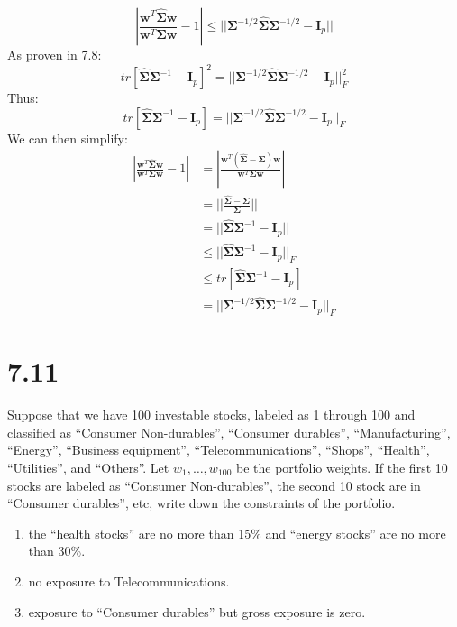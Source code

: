 \documentclass[11pt,]{article}
\begin{document}
\[
|\frac{{\bm{{w}}}^T \hat{{\bm{{\Sigma}}}} {\bm{{w}}} }{ {\bm{{w}}}^T {\bm{{\Sigma}}} {\bm{{w}}}}-1| \leq || {\bm{{\Sigma}}} ^{-1/2} \hat{{\bm{{\Sigma}}}} {\bm{{\Sigma}}}^{-1/2} - {\bm{{I}}}_p||
\] As proven in 7.8: \[
tr[\hat{{\bm{{\Sigma}}}} {\bm{{\Sigma}}}^{-1} - {\bm{{I}}}_p]^2 = || {\bm{{\Sigma}}}^{-1/2} \hat{{\bm{{\Sigma}}}} {\bm{{\Sigma}}}^{-1/2} - {\bm{{I}}}_p||_F^2
\] Thus: \[
tr[\hat{{\bm{{\Sigma}}}} {\bm{{\Sigma}}}^{-1} - {\bm{{I}}}_p] = || {\bm{{\Sigma}}}^{-1/2} \hat{{\bm{{\Sigma}}}} {\bm{{\Sigma}}}^{-1/2} - {\bm{{I}}}_p||_F
\] We can then simplify: \[
\begin{aligned}
|\frac{{\bm{{w}}}^T \hat{{\bm{{\Sigma}}}} {\bm{{w}}} }{ {\bm{{w}}}^T {\bm{{\Sigma}}} {\bm{{w}}}}-1| &=
|\frac{{\bm{{w}}}^T(\hat{{\bm{{\Sigma}}}} - {\bm{{\Sigma}}}) {\bm{{w}}}}{ {\bm{{w}}}^T {\bm{{\Sigma}}} {\bm{{w}}} } |\\
&= || \frac{\hat{{\bm{{\Sigma}}}} - {\bm{{\Sigma}}} }{{\bm{{\Sigma}}}}|| \\
&= ||\hat{{\bm{{\Sigma}}}} {\bm{{\Sigma}}}^{-1} - {\bm{{I}}}_p || \\
&\leq ||\hat{{\bm{{\Sigma}}}} {\bm{{\Sigma}}}^{-1} - {\bm{{I}}}_p ||_F \\
&\leq tr[\hat{{\bm{{\Sigma}}}} {\bm{{\Sigma}}}^{-1} - {\bm{{I}}}_p] \\
&= || {\bm{{\Sigma}}}^{-1/2} \hat{{\bm{{\Sigma}}}} {\bm{{\Sigma}}}^{-1/2} - {\bm{{I}}}_p||_F
\end{aligned}
\]

\hypertarget{section-2}{%
\section{7.11}\label{section-2}}

Suppose that we have 100 investable stocks, labeled as 1 through 100 and
classified as ``Consumer Non-durables'', ``Consumer durables'',
``Manufacturing'', ``Energy'', ``Business equipment'',
``Telecommunications'', ``Shops'', ``Health'', ``Utilities'', and
``Others''. Let \(w_1, \ldots, w_{100}\) be the portfolio weights. If
the first 10 stocks are labeled as ``Consumer Non-durables'', the second
10 stock are in ``Consumer durables'', etc, write down the constraints
of the portfolio.

\begin{enumerate}
\def\labelenumi{\arabic{enumi}.}
\item
  the ``health stocks'' are no more than 15\% and ``energy stocks'' are
  no more than 30\%.
\item
  no exposure to Telecommunications.
\item
  exposure to ``Consumer durables'' but gross exposure is zero.
\end{enumerate}
\end{document}
